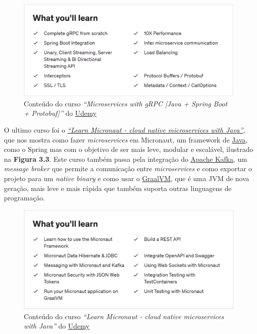 \begin{figure}[!hbt]
  \centering
  \includegraphics[width=14cm]{figuras/udemy2.png}
  \caption{Conteúdo do curso \textit{``Microservices with gRPC [Java + Spring Boot + Protobuf]''} do \href{https://www.udemy.com/}{Udemy}}
  \label{fig:udemy2}
\end{figure}
\FloatBarrier

O ultimo curso foi o \href{https://www.udemy.com/course/learn-micronaut/}{\textit{``Learn Micronaut - cloud native microservices with Java''}}, que nos mostra como fazer \textit{microservices} em Micronaut, um framework de \href{https://jdk.java.net/}{Java}, como o Spring mas com o objetivo de ser mais leve, modular e escalável, ilustrado na \textbf{Figura 3.3}. Este curso também passa pela integração do \href{https://kafka.apache.org/}{Apache Kafka}, um \textit{message broker} que permite a comunicação entre \textit{microservices} e como exportar o projeto para um \textit{native binary} e como usar o \href{https://www.graalvm.org/}{GraalVM}, que é uma JVM de nova geração, mais leve e mais rápida que também suporta outras linguagens de programação.

\begin{figure}[!hbt]
  \centering
  \includegraphics[width=14cm]{figuras/udemy3.png}
  \caption{Conteúdo do curso \textit{``Learn Micronaut - cloud native microservices with Java''} do \href{https://www.udemy.com/}{Udemy}}
  \label{fig:udemy3}
\end{figure}
\FloatBarrier
